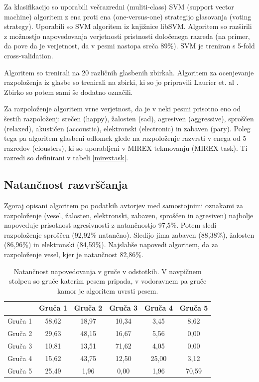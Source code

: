 \documentclass[a4paper, 12pt]{book}
\begin{document}
{Za klasifikacijo so uporabili večrazredni (muliti-class) SVM (support vector machine) algoritem z ena proti ena (one-versus-one) strategijo glasovanja (voting strategy). Uporabili so SVM algoritem iz knjižnice libSVM. Algoritem so razširili z možnostjo napovedovanja verjetnosti pristnosti določenega razreda (na primer, da pove da je verjetnost, da v pesmi nastopa sreča 89\%). SVM je treniran s 5-fold cross-validation.  

Algoritem so trenirali na 20 različnih glasbenih zbirkah. Algoritem za ocenjevanje razpoloženja iz glasbe so trenirali na zbirki, ki so jo pripravili Laurier et. al \cite{laurier2010indexing}. Zbirko so potem sami še dodatno označili. 

Za razpoloženje algoritem vrne verjetnost, da je v neki pesmi prisotno eno od šestih razpoloženj: srečen (happy), žalosten (sad), agresiven (aggressive), sproščen (relaxed), akustičen (accoustic), elektronski (electronic) in zabaven (pary). Poleg tega pa algoritem glasbeni odlomek glede na razpoloženje razvrsti v enega od 5 razredov (clousters), ki so uporabljeni v MIREX tekmovanju (MIREX task). Ti razredi so definirani v tabeli \ref{mirextask}.

\subsection{Natančnost razvrščanja}
\label{natancnostessentia}

Zgoraj opisani algoritem po podatkih avtorjev med samostojnimi oznakami za razpoloženje (vesel, žalosten, elektronski, zabaven, sproščen in agresiven) najbolje napoveduje prisotnost agresivnosti z natančnostjo 97,5\%. Potem sledi razpoloženje sproščen (92,92\% natančno). Sledijo jima zabaven (88,38\%), žalosten (86,96\%) in elektronski (84,59\%). Najslabše napovedi algoritem, da za razpoloženje vesel, kjer je natančnost 82,86\%.

\begin{table}[htb]
\begin{center}
\caption{Natančnost napovedovanja v gruče v odstotkih. V navpičnem stolpcu so gruče katerim pesem pripada, v vodoravnem pa gruče kamor je algoritem uvrsti pesem.}
\begin{tabular}{|l|c|c|c|c|c|}
\hline
 & Gruča 1 & Gruča 2 & Gruča 3 & Gruča 4 & Gruča 5 \\ \hline
Gruča 1 & 58,62 & 18,97	& 10,34 & 3,45 & 8,62 \\ \hline
Gruča 2 & 29,63 & 48,15 & 16,67 & 5,56 & 0,00 \\ \hline
Gruča 3 & 10,81 & 13,51 & 71,62 & 4,05 & 0,00 \\ \hline
Gruča 4 & 15,62	& 43,75	& 12,50	& 25,00	& 3,12 \\ \hline
Gruča 5 & 25,49	& 1,96	& 0,00 & 1,96 & 70,59 \\ \hline


\end{tabular}
\end{center}
\end{table}}
\end{document}
